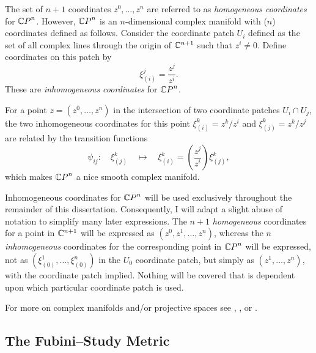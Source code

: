 The set of $n+1$ coordinates $z^0,\ldots,z^n$ are referred to as
\emph{homogeneous coordinates}
for ${\mathbb{C} P}^n$.  However, ${\mathbb{C} P}^n$ is an $n$-dimensional complex
manifold with ($n$) coordinates defined as follows.
Consider the coordinate patch $U_i$ defined as the set of all
complex lines through the origin of ${\mathbb{C}}^{n+1}$ such that $z^i\ne 0$.
Define coordinates on this patch by
\begin{equation}
\xi^j_{(i)} = \frac{z^j}{z^i}.
\end{equation}
These are \emph{inhomogeneous coordinates} for ${\mathbb{C} P}^n$.

For a point $z=(z^0,\ldots,z^n)$ in the intersection of 
two coordinate patches $U_i\cap U_j$,
the two inhomogeneous coordinates for this point
$\xi^k_{(i)}={z^k}/{z^i}$ and
$\xi^k_{(j)}={z^k}/{z^j}$
are related by the transition functions
\begin{equation}
\psi_{ij}\colon\quad \xi^k_{(j)}\quad\mapsto
\quad\xi^k_{(i)} = \left( \frac{z^j}{z^i} \right)
\xi^k_{(j)},
\end{equation}
which makes ${\mathbb{C} P}^n$ a nice smooth complex manifold.

Inhomogeneous coordinates for ${\mathbb{C} P}^n$ will be used
exclusively throughout the remainder of this dissertation.
Consequently, I will adapt a slight abuse of notation to simplify
many later expressions.
The $n+1$ \emph{homogeneous} coordinates for a point in ${\mathbb{C}}^{n+1}$ will be expressed
as $(z^0,z^1,\ldots,z^n)$, whereas the $n$ \emph{inhomogeneous} coordinates for the
corresponding point in ${\mathbb{C} P}^n$ will be expressed, not as
$(\xi^1_{(0)},\ldots,\xi^n_{(0)})$ in the $U_0$ coordinate patch, but
simply as $(z^1,\ldots,z^n)$, with the coordinate patch implied.
Nothing will be covered that is dependent upon which 
particular coordinate patch
is used.

For more on complex manifolds and/or projective spaces
see \cite{Nakahara:90}, \cite{Yano:65}, or \cite{Nash:91}.



\subsection{The Fubini--Study Metric}


